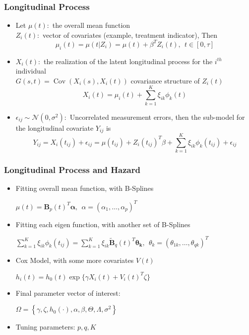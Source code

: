 \documentclass[10pt,dvipsnames,table]{beamer}
\newcommand{\Cov}[2]{\operatorname{Cov}\left( #1,#2 \right)}
\begin{document}
\begin{frame}
\frametitle{Longitudinal Process}
\begin{itemize}
\pause \item Let $\mu(t):$ the overall mean function \\
$Z_i(t):$ vector of covariates (example, treatment indicator), Then
\[ \mu_i(t) = \mu(t|Z_i) = \mu(t) + \beta^T Z_i(t), \ \ t \in [0, \tau] \]
\pause \item $X_i(t):$ the realization of the latent longitudinal process for the $i^{th}$ individual \\
$G(s, t) = \Cov{X_i(s)}{X_i(t)}$ covariance structure of $Z_i (t)$
\[ X_i (t) = \mu_i (t) + \sum_{k=1}^{K} \xi_{ik} \phi_k (t) \]
\pause \item $\epsilon _{ij} \sim  \mathcal{N}(0, \sigma^2): $ Uncorrelated measurement errors, then the sub-model for the longitudinal covariate $Y_{ij}$ is 
\[ Y_{ij} =  X_i(t_{ij}) + \epsilon _{ij} = \mu(t_{ij}) + Z_i(t_{ij})^T\beta + \sum_{k=1}^{K} \xi_{ik} \phi_k (t_{ij})+ \epsilon_{ij}\]
\end{itemize}

\end{frame}

\begin{frame}
\frametitle{Longitudinal Process and Hazard}
\begin{itemize}
\pause \item Fitting overall mean function, with B-Splines \\
\begin{center}
$ \mu(t) =  \mathbf{B}_p(t)^T \mathbf{\alpha},\ \ \alpha = (\alpha_1, \dots, \alpha_p)^T $
\end{center}
\pause \item Fitting each eigen function, with another set of B-Splines \\
\begin{center}
$ \sum_{k=1}^{K} \xi_{ik} \phi_k (t_{ij}) =  \sum_{k=1}^{K} \xi_{ik} \widetilde{\mathbf{B}}_q(t)^T \mathbf{\theta _k},\ \ \theta_{k} = (\theta_{1k}, \dots, \theta_{qk})^T $
\end{center}
\pause \item Cox Model, with some more covariates $V(t)$
\begin{center}
$ h_i(t) = h_0(t)\exp\{\gamma X_i(t) + V_i(t)^T \zeta \}$
\end{center}
\pause \item Final parameter vector of interest:
\begin{center}
$ \Omega = \left\{ \gamma, \zeta, h_0(\cdot), \alpha, \beta, \Theta, \Lambda, \sigma^2 \right\} $
\end{center}
\item Tuning parameters: $p, q, K$
\end{itemize}
\end{frame}
\end{document}
